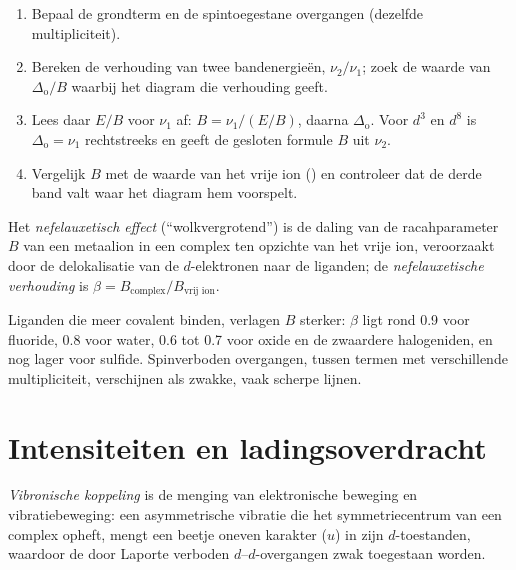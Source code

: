 \begin{method}\label{met:b3:complex-spectra-magnetism:read-ts}
\begin{enumerate}
  \item Bepaal de grondterm en de spintoegestane overgangen (dezelfde
        multipliciteit).
  \item Bereken de verhouding van twee bandenergieën, $\nu_2/\nu_1$; zoek de waarde van $\Delta_{\mathrm o}/B$
        waarbij het diagram die verhouding geeft.
  \item Lees daar $E/B$ voor $\nu_1$ af: $B = \nu_1/(E/B)$, daarna $\Delta_{\mathrm o}$. Voor $d^3$ en $d^8$ is $\Delta_{\mathrm o} = \nu_1$
        rechtstreeks en geeft de gesloten formule $B$ uit $\nu_2$.
  \item Vergelijk $B$ met de waarde van het vrije ion () en controleer dat de derde band valt waar het diagram
        hem voorspelt.
\end{enumerate}
\end{method}

\begin{definition}\label{def:b3:complex-spectra-magnetism:nephelauxetic}
Het \emph{nefelauxetisch effect}
(``wolkvergrotend'') is
de daling van de racahparameter $B$ van een metaalion in een complex ten
opzichte van het vrije ion, veroorzaakt door de delokalisatie van de
$d$-elektronen naar de
liganden; de \emph{nefelauxetische verhouding} is $\beta =
B_{\text{complex}}/B_{\text{vrij ion}}$.
\end{definition}

Liganden die meer covalent binden, verlagen $B$ sterker: $\beta$ ligt rond 0.9 voor fluoride, 0.8
voor water, 0.6 tot 0.7 voor oxide en de zwaardere halogeniden, en nog
lager voor sulfide. Spinverboden overgangen, tussen termen met
verschillende multipliciteit, verschijnen als zwakke, vaak scherpe
lijnen.

\section{Intensiteiten en ladingsoverdracht}

\begin{definition}\label{def:b3:complex-spectra-magnetism:vibronic-coupling}
\emph{Vibronische koppeling} is de menging van
elektronische beweging en vibratiebeweging: een asymmetrische vibratie
die het symmetriecentrum van een complex opheft, mengt een beetje oneven
karakter ($u$) in zijn $d$-toestanden,
waardoor de door Laporte verboden $d$--$d$-overgangen zwak toegestaan worden.
\end{definition}

